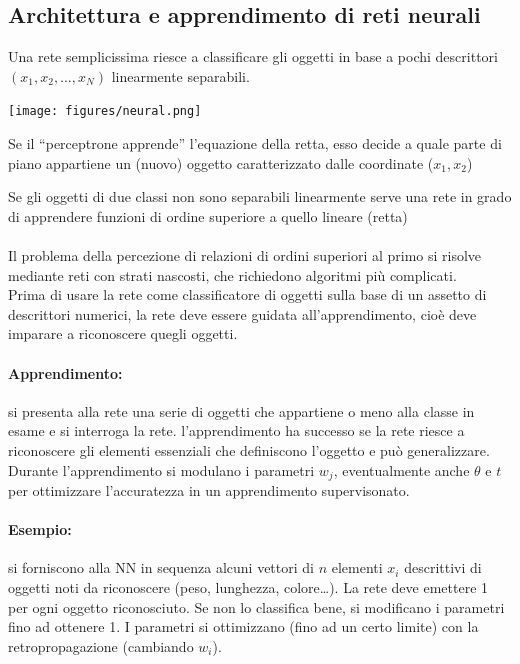 \documentclass{article}
\begin{document}
\subsection{Architettura e apprendimento di reti neurali}
Una rete semplicissima riesce a classificare gli oggetti in base a
pochi descrittori $(x_1,x_2,\dots,x_N)$ linearmente separabili.
\begin{center}
    \texttt{[image: figures/neural.png]}
\end{center}
\begin{minipage}[t]{.5\textwidth}
    \begin{flushleft}
    Se il “perceptrone apprende” l'equazione della
    retta, esso decide a quale parte di piano
    appartiene un (nuovo) oggetto caratterizzato
    dalle coordinate ($x_1,x_2$)
    \end{flushleft}
\end{minipage}%
\begin{minipage}[t]{.5\textwidth}
    \begin{flushright}
        Se gli oggetti di due classi non sono
        separabili linearmente serve una rete in
        grado di apprendere funzioni di ordine
        superiore a quello lineare (retta)
    \end{flushright}
\end{minipage}
\paragraph{}
Il problema della percezione di relazioni di ordini superiori al primo
si risolve mediante reti con strati nascosti, che richiedono
algoritmi più complicati.\\
Prima di usare la rete come classificatore di oggetti sulla base di un
assetto di descrittori numerici, la rete deve essere guidata
all'apprendimento, cioè deve imparare a riconoscere quegli oggetti.
\paragraph{Apprendimento:} si presenta alla rete una serie di oggetti che
appartiene o meno alla classe in esame e si interroga la rete.
l'apprendimento ha successo se la rete riesce a riconoscere gli
elementi essenziali che definiscono l'oggetto e può generalizzare.\\
Durante l'apprendimento si modulano i parametri $w_j$, eventualmente
anche $\theta$ e $t$ per ottimizzare l'accuratezza in un apprendimento
supervisonato.
\paragraph{Esempio:} si forniscono alla NN in sequenza alcuni vettori di $n$
elementi $x_i$ descrittivi di oggetti noti da riconoscere (peso,
lunghezza, colore…). La rete deve emettere 1 per ogni oggetto riconosciuto. Se non lo classifica
bene, si modificano i parametri fino ad ottenere 1. I parametri si
ottimizzano (fino ad un certo limite) con la retropropagazione (cambiando $w_i$).
\end{document}
